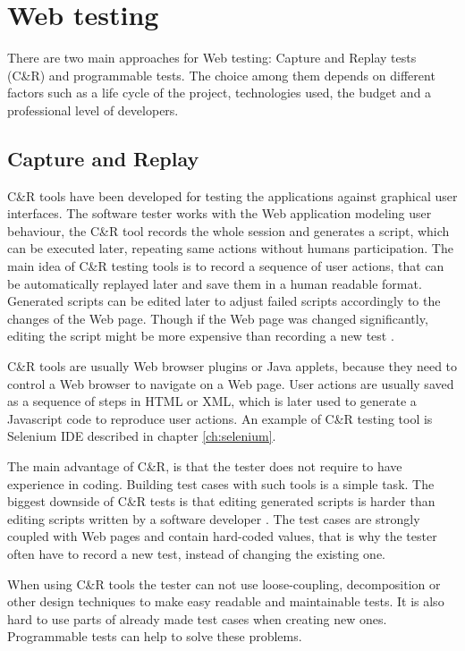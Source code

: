	\chapter{Web testing}
	\label{ch:Webtesting}

		There are two main approaches for Web testing: Capture
		and Replay tests (C\&R) and programmable tests. The choice among them depends
		on different factors such as a life cycle of the project, technologies used, the
		budget and a professional level of developers.
		
\section{Capture and Replay}
\label{sec:captureReplay}
C\&R tools have been developed for testing the applications against graphical user interfaces. 
The software tester works with the Web application modeling user behaviour,
the C\&R tool records the whole session and generates a
script, which can be executed later,	repeating same actions without humans participation.
The main idea of C\&R
testing tools is to record a sequence of user actions, that can be
automatically replayed later and save them in a human readable format. Generated
scripts can be edited later to adjust failed scripts accordingly to the
changes of the Web page.
Though if the Web page was changed	significantly, editing the script might be
more expensive than recording a new test \cite{CaptureReplay7}. 
			
C\&R tools are usually Web browser plugins or Java applets, because they
need to control a Web browser to navigate on a Web page. User actions are
usually saved as a sequence of steps in HTML or XML, which is later used to
generate a Javascript code to reproduce user actions. An example of C\&R testing
tool is Selenium IDE described in chapter \ref{ch:selenium}.

The main advantage of C\&R, is that the tester does not
require to have experience in coding. Building test cases with such tools
is a simple task.
The biggest downside of C\&R tests is that editing generated
scripts is harder than editing scripts written by a software
developer \cite{CaptureReplay7}. The test cases are strongly coupled with Web
pages and contain hard-coded values, that is why the tester often have to record
a new test, instead of changing the existing one.

 When using C\&R tools the tester can
not use loose-coupling, decomposition or other design techniques to make
easy readable and maintainable tests. It is also hard to use parts of already
made test cases when creating new ones. Programmable tests can help to solve these problems.

